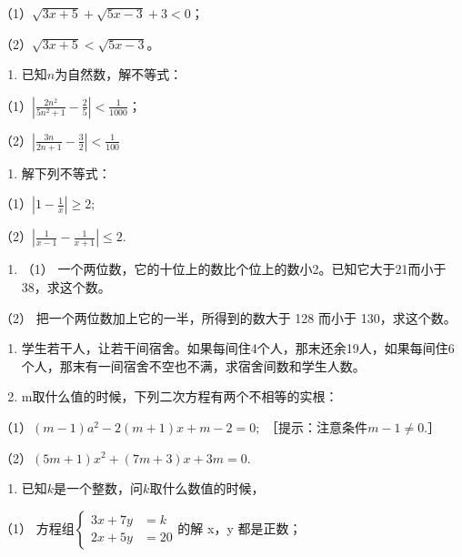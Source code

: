 （1）\(\sqrt{3x + 5} + \sqrt{5x - 3} + 3 < 0\)；

（2）\(\sqrt{3x + 5} < \sqrt{5x - 3}\)。

\begin{enumerate}[start=15]
\item
  已知\(n\)为自然数，解不等式：
\end{enumerate}

（1）\(\left|\frac{2n^2}{5n^2 + 1} - \frac{2}{5}\right| < \frac{1}{1000}\)；

（2）\(\left|\frac{3n}{2n + 1} -\frac{3}{2}\right| < \frac{1}{100}\)

\begin{enumerate}[start=16]
\item
  解下列不等式：
\end{enumerate}

（1）\(\left|1 - \frac{1}{x}\right| \geqslant 2;\)

（2）\(\left|\frac{1}{x - 1} - \frac{1}{x + 1}\right| \leqslant 2.\)

\begin{enumerate}[start=17]
\item
  （1）
  一个两位数，它的十位上的数比个位上的数小2。已知它大于21而小于38，求这个数。
\end{enumerate}

（2） 把一个两位数加上它的一半，所得到的数大于 128 而小于
130，求这个数。

\begin{enumerate}[start=18]
\item
  学生若干人，让若干间宿舍。如果每间住4个人，那末还余19人，如果每间住6个人，那末有一间宿舍不空也不满，求宿舍间数和学生人数。
\item
  m取什么值的时候，下列二次方程有两个不相等的实根：
\end{enumerate}

（1）\((m - 1)a^{2} - 2(m + 1)x + m - 2 = 0;\)
［提示：注意条件\(m-1 \neq 0\).］

（2）\((5m + 1)x^{2} + (7m + 3)x + 3m = 0.\)

\begin{enumerate}[start=20]
\item
  已知\(k\)是一个整数，问\(k\)取什么数值的时候，
\end{enumerate}

（1）
方程组\(\left\{\begin{aligned}3x+7y&=k\\ 2x+5y&=20\end{aligned}\right.\)的解
x，y 都是正数；

